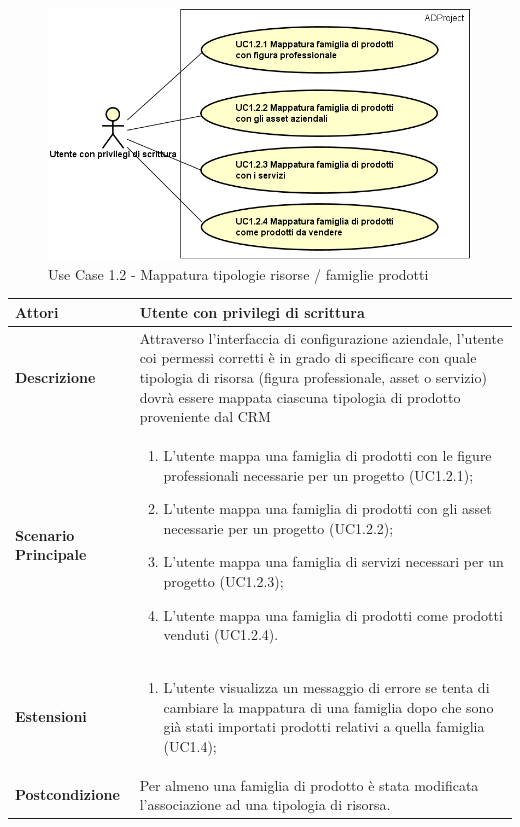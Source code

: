 	\begin{figure}[H]
		\centering
		\includegraphics[width=\linewidth]{images/useCase/UC1_2}
		\caption{Use Case 1.2 - Mappatura tipologie risorse / famiglie prodotti}
		\label{fig:uc1.2}
	\end{figure}

	\begin{longtable}{ | p{2.7cm} | p{12cm} |}
		\hline \textbf{Attori} & Utente con privilegi di scrittura\\ 
		\hline \textbf{Descrizione} & Attraverso l’interfaccia di configurazione aziendale, l’utente coi permessi corretti è in grado di specificare con quale tipologia di risorsa (figura professionale, asset o servizio) dovrà essere mappata ciascuna tipologia di prodotto proveniente dal CRM\\ 
		\hline \textbf{Scenario Principale} & \begin{enumerate}
			\itemsep-0.5em 
			\item L’utente mappa una famiglia di prodotti con le figure professionali necessarie per un progetto  (UC1.2.1);
			\item L’utente mappa una famiglia di prodotti con gli asset necessarie per un progetto  (UC1.2.2);
			\item L’utente mappa una famiglia di servizi necessari per un progetto  (UC1.2.3);
			\item L’utente mappa una famiglia di prodotti come prodotti venduti (UC1.2.4).
			
		\end{enumerate}
		\\ 
		\hline \textbf{Estensioni} & \begin{enumerate}
			\item L’utente visualizza un messaggio di errore se tenta di cambiare la mappatura di una famiglia dopo che sono già stati importati prodotti relativi a quella famiglia  (UC1.4);
			
		\end{enumerate}
		\\ 
		\hline \textbf{Postcondizione} & Per almeno una famiglia di prodotto è stata modificata l’associazione ad una tipologia di risorsa. \\ 
		\hline 
	\end{longtable}
	

